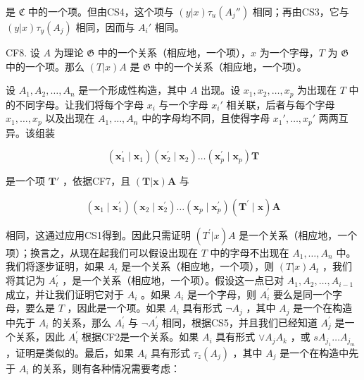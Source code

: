 是 \(\mathfrak{C}\) 中的一个项。但由CS4，这个项与 \((y|x)\tau_u(A_j'')\) 相同；再由CS3，它与 \((y|x)\tau_y(A_j)\) 相同，因而与 \(A_i'\) 相同。

CF8. 设 \(A\) 为理论 \(\mathfrak{G}\) 中的一个关系（相应地，一个项），\(x\) 为一个字母，\(T\) 为 \(\mathfrak{G}\) 中的一个项。那么 \((T|x)A\) 是 \(\mathfrak{G}\) 中的一个关系（相应地，一个项）。

设 \(A_1, A_2, \ldots, A_n\) 是一个形成性构造，其中 \(A\) 出现。设 \(x_1, x_2, \ldots, x_p\) 为出现在 \(T\) 中的不同字母。让我们将每个字母 \(x_i\) 与一个字母 \(x_i'\) 相关联，后者与每个字母 \(x_1, \ldots, x_p\) 以及出现在 \(A_1, \ldots, A_n\) 中的字母均不同，且使得字母 \(x_1', \ldots, x_p'\) 两两互异。该组装

\[
\left(\boldsymbol {x} _ {1} ^ {\prime} \mid \boldsymbol {x} _ {1}\right) \left(\boldsymbol {x} _ {2} ^ {\prime} \mid \boldsymbol {x} _ {2}\right) \dots \left(\boldsymbol {x} _ {p} ^ {\prime} \mid \boldsymbol {x} _ {p}\right) \boldsymbol {T}
\]

是一个项 \(\pmb{T}'\) ，依据CF7，且 \((\pmb{T}|\pmb{x})\pmb{A}\) 与

\[
\left(\boldsymbol {x} _ {1} \mid \boldsymbol {x} _ {1} ^ {\prime}\right) \left(\boldsymbol {x} _ {2} \mid \boldsymbol {x} _ {2} ^ {\prime}\right) \dots \left(\boldsymbol {x} _ {p} \mid \boldsymbol {x} _ {p} ^ {\prime}\right) \left(\boldsymbol {T} ^ {\prime} \mid \boldsymbol {x}\right) \boldsymbol {A}
\]

相同，这通过应用CS1得到。因此只需证明 \((T^{\prime}|x)A\) 是一个关系（相应地，一个项）；换言之，从现在起我们可以假设出现在 \(T\) 中的字母不出现在 \(A_{1},\ldots ,A_{n}\) 中。我们将逐步证明，如果 \(A_{t}\) 是一个关系（相应地，一个项），则 \((T|x)A_{t}\) ，我们将其记为 \(A_{t}^{\prime}\) ，是一个关系（相应地，一个项）。假设这一点已对 \(A_{1},A_{2},\ldots ,A_{i - 1}\) 成立，并让我们证明它对于 \(A_{i}\) 。如果 \(A_{i}\) 是一个字母，则 \(A_{i}^{\prime}\) 要么是同一个字母，要么是 \(T\) ，因此是一个项。如果 \(A_{i}\) 具有形式 \(\lnot A_j\) ，其中 \(A_{j}\) 是一个在构造中先于 \(A_{i}\) 的关系，那么 \(A_{i}^{\prime}\) 与 \(\lnot A_j^{\prime}\) 相同，根据CS5，并且我们已经知道 \(A_{j}^{\prime}\) 是一个关系，因此 \(A_{i}^{\prime}\) 根据CF2是一个关系。如果 \(A_{i}\) 具有形式 \(\vee A_{j}A_{k}\) ，或 \(sA_{j_1}\ldots A_{j_m}\) ，证明是类似的。最后，如果 \(A_{i}\) 具有形式 \(\tau_{z}(A_j)\) ，其中 \(A_{j}\) 是一个在构造中先于 \(A_{i}\) 的关系，则有各种情况需要考虑：

